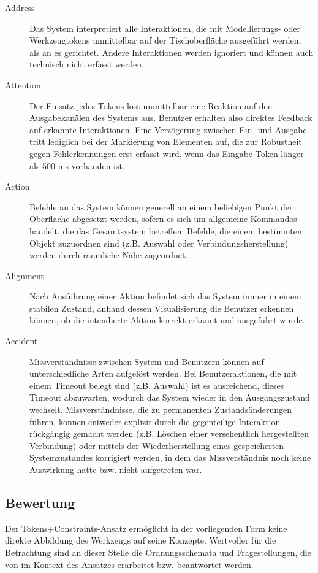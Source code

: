 \begin{description}
	\item[Address] Das System interpretiert alle Interaktionen, die mit Modellierungs- oder Werkzeugtokens unmittelbar auf der Tischoberfläche ausgeführt werden, als an es gerichtet. Andere Interaktionen werden ignoriert und können auch technisch nicht erfasst werden.
	\item[Attention] Der Einsatz jedes Tokens löst unmittelbar eine Reaktion auf den Ausgabekanälen des Systems aus. Benutzer erhalten also direktes Feedback auf erkannte Interaktionen. Eine Verzögerung zwischen Ein- und Ausgabe tritt lediglich bei der Markierung von Elementen auf, die zur Robustheit gegen Fehlerkennungen erst erfasst wird, wenn das  Eingabe-Token länger als 500 ms vorhanden ist.
	\item[Action] Befehle an das System können generell an einem beliebigen Punkt der Oberfläche abgesetzt werden, sofern es sich um allgemeine Kommandos handelt, die das Gesamtsystem betreffen. Befehle, die einem bestimmten Objekt zuzuordnen sind (z.B. Auswahl oder Verbindungsherstellung) werden durch räumliche Nähe zugeordnet.
	\item[Alignment] Nach Ausführung einer Aktion befindet sich das System immer in einem stabilen Zustand, anhand dessen Visualisierung die Benutzer erkennen können, ob die intendierte Aktion korrekt erkannt und ausgeführt wurde.
	\item[Accident] Missverständnisse zwischen System und Benutzern können auf unterschiedliche Arten aufgelöst werden. Bei Benutzeraktionen, die mit einem Timeout belegt sind (z.B. Auswahl) ist es ausreichend, dieses Timeout abzuwarten, wodurch das System wieder in den Ausgangszustand wechselt. Missverständnisse, die zu permanenten Zustandsänderungen führen, können entweder explizit durch die gegenteilige Interaktion rückgängig gemacht werden (z.B. Löschen einer versehentlich hergestellten Verbindung) oder mittels der Wiederherstellung eines gespeicherten Systemzustandes korrigiert werden, in dem das Missverständnis noch keine Auswirkung hatte bzw. nicht aufgetreten war.
\end{description}

\subsection{Bewertung}

Der Tokens+Constraints-Ansatz ermöglicht in der vorliegenden Form keine direkte Abbildung des Werkzeugs auf seine Konzepte. Wertvoller für die Betrachtung sind an dieser Stelle die Ordnungsschemata und Fragestellungen, die von \citet{Ullmer05} im Kontext des Ansatzes erarbeitet bzw. beantwortet werden. 


